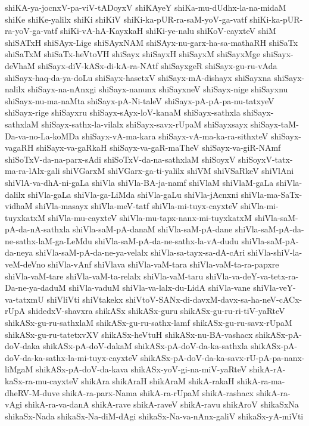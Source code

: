 {shiKA-ya-jocnxV-pa-viV-tADoyxV
shiKAyeY
shiKa-mu-dUdhx-la-na-midaM
shiKe
shiKe-yalilx
shiKi
shiKiV
shiKi-ka-pUR-ra-saM-yoV-ga-vatf
shiKi-ka-pUR-ra-yoV-ga-vatf
shiKi-vA-hA-KayxkaH
shiKi-ye-nalu
shiKoV-cayxteV
shiM
shiSATxH
shiSAyx-Lige
shiSAyxNAM
shiSAyx-nu-garx-ha-sa-mathaRH
shiSaTx
shiSaTxM
shiSaTx-heVtoVH
shiSayx
shiSayxH
shiSayxM
shiSayxMge
shiSayx-deVhaM
shiSayx-diV-kASx-di-kA-ra-NAtf
shiSayxgeR
shiSayx-gu-ru-vAda
shiSayx-haq-da-ya-doLu
shiSayx-hasetxV
shiSayx-mA-dishayx
shiSayxna
shiSayx-nalilx
shiSayx-na-nAnxgi
shiSayx-nanunx
shiSayxneV
shiSayx-nige
shiSayxnu
shiSayx-nu-ma-naMta
shiSayx-pA-Ni-taleV
shiSayx-pA-pA-pa-nu-tatxyeV
shiSayx-rige
shiSayxru
shiSayx-sAyx-loV-kanaM
shiSayx-sathxla
shiSayx-sathxlaM
shiSayx-sathx-la-vilalx
shiSayx-savx-rUpaM
shiSayxsayx
shiSayx-taM-Da-va-no-La-koMDa
shiSayx-vA-ma-kara
shiSayx-vA-ma-ka-ra-sithxteV
shiSayx-vagaRH
shiSayx-va-gaRkaH
shiSayx-va-gaR-maTheV
shiSayx-va-giR-NAmf
shiSoTxV-da-na-parx-sAdi
shiSoTxV-da-na-sathxlaM
shiSoyxV
shiSoyxV-tatx-ma-ra-lAlx-gali
shiVGarxM
shiVGarx-ga-ti-yalilx
shiVM
shiVSaRkeV
shiVlAni
shiVlA-va-dhA-ni-gaLa
shiVla
shiVla-BA-ja-namf
shiVlaM
shiVlaM-gaLa
shiVla-dalilx
shiVla-gaLa
shiVla-ga-LiMda
shiVla-gaLu
shiVla-jAcnxni
shiVla-ma-SaTx-vidhaM
shiVla-masayx
shiVla-meV-tatf
shiVla-mi-tuyx-cayxteV
shiVla-mi-tuyxkatxM
shiVla-mu-cayxteV
shiVla-mu-tapx-nanx-mi-tuyxkatxM
shiVla-saM-pA-da-nA-sathxla
shiVla-saM-pA-danaM
shiVla-saM-pA-dane
shiVla-saM-pA-da-ne-sathx-laM-ga-LeMdu
shiVla-saM-pA-da-ne-sathx-la-vA-dudu
shiVla-saM-pA-da-neya
shiVla-saM-pA-da-ne-ya-velalx
shiVla-sa-tayx-sa-dA-cAri
shiVla-shiV-la-veM-deVno
shiVla-vAnf
shiVlava
shiVla-vaM-tara
shiVla-vaM-ta-ra-papxre
shiVla-vaM-tare
shiVla-vaM-ta-relalx
shiVla-vaM-taru
shiVla-va-deY-va-tetx-ra-Da-ne-ya-daduM
shiVla-vaduM
shiVla-va-lalx-du-LidA
shiVla-vane
shiVla-veY-va-tatxmU
shiVliVti
shiVtakekx
shiVtoV-SANx-di-davxM-davx-sa-ha-neV-cACx-rUpA
shidedxV-shavxra
shikASx
shikASx-guru
shikASx-gu-ru-ri-tiV-yaRteV
shikASx-gu-ru-sathxlaM
shikASx-gu-ru-sathx-lamf
shikASx-gu-ru-savx-rUpaM
shikASx-gu-ru-tatetxvXV
shikASx-heVtuH
shikASx-nu-BA-vashacx
shikASx-pA-doV-daka
shikASx-pA-doV-dakaM
shikASx-pA-doV-da-ka-sathxla
shikASx-pA-doV-da-ka-sathx-la-mi-tuyx-cayxteV
shikASx-pA-doV-da-ka-savx-rU-pA-pa-nanx-liMgaM
shikASx-pA-doV-da-kava
shikASx-yoV-gi-na-miV-yaRteV
shikA-rA-kaSx-ra-mu-cayxteV
shikAra
shikAraH
shikAraM
shikA-rakaH
shikA-ra-ma-dheRV-M-duve
shikA-ra-parx-Nama
shikA-ra-rUpaM
shikA-rashacx
shikA-ra-vAgi
shikA-ra-va-danA
shikA-rave
shikA-raveV
shikA-ravu
shikAroV
shikaSxNa
shikaSx-Nada
shikaSx-Na-diM-dAgi
shikaSx-Na-va-nAnx-galiV
shikaSx-yA-miVti
}

